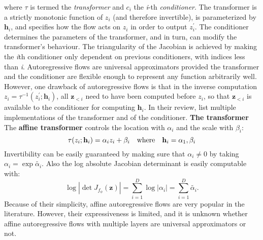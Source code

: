 \documentclass[english]{scrartcl}
\begin{document}
    where $\tau$ is termed the \textit{transformer} and $c_i$ the \textit{i}-th \textit{conditioner}.
    The transformer is a strictly monotonic function of $z_i$ (and therefore invertible), is parameterized by $\textbf{h}_i$, and specifies how the flow acts on $z_i$ in order to output $z_i^{\prime}$.
    The conditioner determines the parameters of the transformer, and in turn, can modify the transformer's behaviour.
    The triangularity of the Jacobian is achieved by making the \textit{i}th conditioner only dependent on previous conditioners, with indices less than \textit{i}.
    Autoregressive flows are universal approximators provided the transformer and the conditioner are flexible enough to represent any function arbitrarily well.
    However, one drawback of autoregressive flows is that in the inverse computation $z_i = \tau ^{-1} (z_i ^{\prime}; \textbf{h}_i)$, all $\textbf{z}_{<i}$ need to have been computed before $z_i$, so that $\textbf{z}_{<i}$ is available to the conditioner for computing $\textbf{h}_i$.
    In their review, \cite{papamakarios_normalizing_2019} list multiple implementations of the transformer and of the conditioner.
\newline
    \textbf{The transformer}
\newline
    The \textbf{affine transformer} controls the location with $\alpha_i$ and the scale with $\beta_i$:
    \begin{equation}
        \tau(z_i;\textbf{h}_i) = \alpha_i z_i +\beta _i \quad \text{where} \quad \textbf{h}_i = {\alpha_1, \beta_i}
    \end{equation}
    Invertibility can be easily guaranteed by making sure that $\alpha _i \neq 0$ by taking $\alpha _i = \exp \tilde{\alpha _i}$.
    Also the log absolute Jacobian determinant is easily computable with:
    \begin{equation}
        \log |\det J_{f_\phi}(\textbf{z})| = \sum _{i=1} ^{D} \log |\alpha _i| = \sum _{i=1} ^{D} \tilde{\alpha _i}.
    \end{equation}
    Because of their simplicity, affine autoregressive flows are very popular in the literature.
    However, their expressiveness is limited, and it is unknown whether affine autoregressive flows with multiple layers are universal approximators or not.
\end{document}
